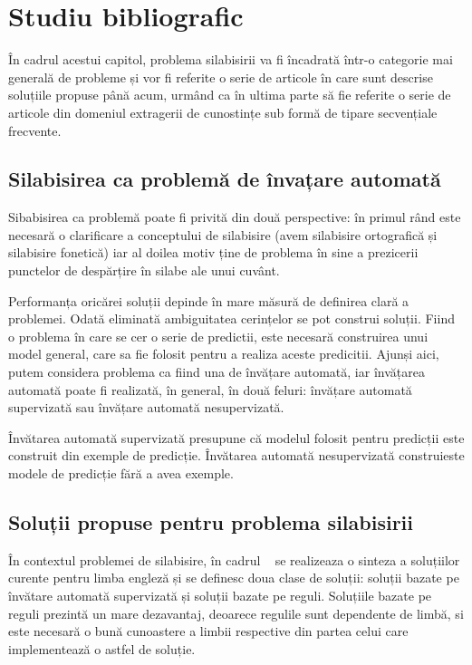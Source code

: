 \chapter{Studiu bibliografic}
\label{cap:studiu-bibliografic}

În cadrul acestui capitol, problema silabisirii va fi încadrată într-o categorie mai generală de probleme și vor fi referite o serie de articole în care sunt descrise soluțiile propuse până acum, urmând ca în ultima parte să fie referite o serie de articole din domeniul extragerii de cunostințe sub formă de tipare secvențiale frecvente.

\section{Silabisirea ca problemă de învațare automată}

Sibabisirea ca problemă poate fi privită din două perspective: în primul rând este necesară o clarificare a conceptului de silabisire (avem silabisire ortografică și silabisire fonetică) iar al doilea motiv ține de problema în sine a prezicerii punctelor de despărțire în silabe ale unui cuvânt. 

Performanța oricărei soluții depinde în mare măsură de definirea clară a problemei. Odată eliminată ambiguitatea cerințelor se pot construi soluții. Fiind o problema în care se cer o serie de predictii, este necesară construirea unui model general, care sa fie folosit pentru a realiza aceste predicitii. Ajunși aici, putem considera problema ca fiind una de învățare automată, iar învățarea automată poate fi realizată, în general, în două feluri: învățare automată supervizată sau învățare automată nesupervizată. 

Învătarea automată supervizată presupune că modelul folosit pentru predicții este construit din exemple de predicție. Învătarea automată nesupervizată construieste modele de predicție fără a avea exemple. 

\section{Soluții propuse pentru problema silabisirii}

În contextul problemei de silabisire, în cadrul ~\cite{bib:marchand2009automatic} se realizeaza o sinteza a soluțiilor curente pentru limba engleză și se definesc doua clase de soluții: soluții bazate pe învătare automată supervizată și soluții bazate pe reguli. Soluțiile bazate pe reguli prezintă un mare dezavantaj, deoarece regulile sunt dependente de limbă, si este necesară o bună cunoastere a limbii respective din partea celui care implementează o astfel de soluție.


